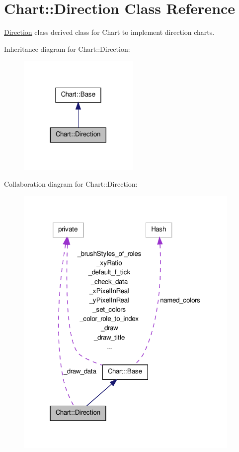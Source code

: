 \hypertarget{classChart_1_1Direction}{
\section{Chart::Direction Class Reference}
\label{classChart_1_1Direction}
}


\hyperlink{classChart_1_1Direction}{Direction} class derived class for Chart to implement direction charts.  




Inheritance diagram for Chart::Direction:\nopagebreak
\begin{figure}[H]
\begin{center}
\leavevmode
\includegraphics[width=164pt]{classChart_1_1Direction__inherit__graph}
\end{center}
\end{figure}


Collaboration diagram for Chart::Direction:\nopagebreak
\begin{figure}[H]
\begin{center}
\leavevmode
\includegraphics[width=307pt]{classChart_1_1Direction__coll__graph}
\end{center}
\end{figure}

